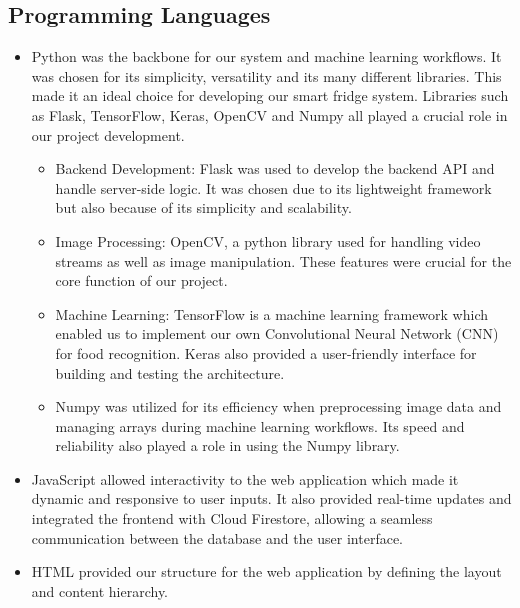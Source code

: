 \documentclass[conference]{IEEEtran}
\begin{document}
\subsection{Programming Languages}
\begin{itemize}
    \item Python was the backbone for our system and machine learning workflows. It was chosen for its simplicity, versatility and its many different libraries. This made it an ideal choice for developing our smart fridge system. Libraries such as Flask, TensorFlow, Keras, OpenCV and Numpy all played a crucial role in our project development.
    \begin{itemize}
        \item Backend Development: Flask was used to develop the backend API and handle server-side logic. It was chosen due to its lightweight framework but also because of its simplicity and scalability.
        \item Image Processing: OpenCV, a python library used for handling video streams as well as image manipulation. These features were crucial for the core function of our project.
        \item Machine Learning: TensorFlow is a machine learning framework which enabled us to implement our own Convolutional Neural Network (CNN) for food recognition. Keras also provided a user-friendly interface for building and testing the architecture.
        \item Numpy was utilized for its efficiency when preprocessing image data and managing arrays during machine learning workflows. Its speed and reliability also played a role in using the Numpy library.
    \end{itemize}
    \item JavaScript allowed interactivity to the web application which made it dynamic and responsive to user inputs. It also provided real-time updates and integrated the frontend with Cloud Firestore, allowing a seamless communication between the database and the user interface.
    \item HTML provided our structure for the web application by defining the layout and content hierarchy.
\end{itemize}
\end{document}
